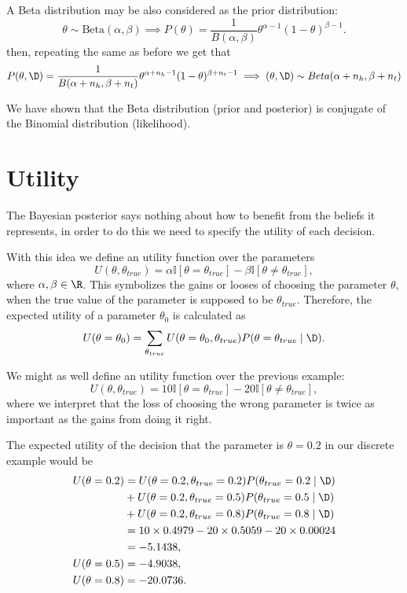 A Beta distribution may be also considered as the prior distribution:
\[
  \theta \sim \text{Beta}(\alpha, \beta) \implies P(\theta) = \frac{1}{B(\alpha, \beta)}\theta^{\alpha - 1}(1 - \theta)^{\beta - 1}.
\]
then, repeating the same as before we get that
\[
  P(\theta, \D) = \frac{1}{B(\alpha + n_h, \beta + n_t)}\theta^{\alpha
    + n_h - 1}(1 - \theta)^{\beta + n_t - 1} \implies (\theta, \D) \sim Beta(\alpha + n_h, \beta + n_t)
\]
\begin{remark}
  We have shown that the Beta distribution (prior and posterior) is conjugate of the Binomial distribution (likelihood).
\end{remark}

\section{Utility}
The Bayesian posterior says nothing about how to benefit from the beliefs it
represents, in order to do this we need to specify the utility of each decision.

With this idea we define an utility function over the parameters
\[
  U(\theta, \theta_{true}) = \alpha \mathbb{I}[\theta = \theta_{true}] - \beta
  \mathbb{I}[\theta \neq \theta_{true}],
\]
where \(\alpha, \beta \in \R\). This symbolizes the gains or looses of choosing
the parameter \(\theta\), when the true value of the parameter is supposed to be
\(\theta_{true}\). Therefore, the expected utility of a parameter \(\theta_0\) is
calculated as
\[
  U(\theta = \theta_0) = \sum_{\theta_{true}}U(\theta = \theta_0,
  \theta_{true})P(\theta = \theta_{true}  \mid  \D).
\]

We might as well define an utility function over the previous example:
\[
  U(\theta, \theta_{true}) = 10\mathbb{I}[\theta = \theta_{true}] - 20
  \mathbb{I}[\theta \neq \theta_{true}],
\]
where we interpret that the loss of choosing the wrong parameter is twice as
important as the gains from doing it right.

The expected utility of the decision that the parameter is \(\theta = 0.2\)
in our discrete example would be
\[
  \begin{aligned}
  U(\theta = 0.2) &= U(\theta = 0.2, \theta_{true} = 0.2)P(\theta_{true} = 0.2  \mid
  \D)\\
  &+ U(\theta = 0.2, \theta_{true} = 0.5)P(\theta_{true} = 0.5  \mid
  \D) \\
  & +  U(\theta = 0.2, \theta_{true} = 0.8)P(\theta_{true} = 0.8  \mid  \D)\\
  &= 10 \times 0.4979 - 20\times 0.5059 -20 \times 0.00024 \\
  &= -5.1438,\\
  U(\theta = 0.5) &= -4.9038, \\
  U(\theta = 0.8) &= -20.0736.
\end{aligned}
\]

